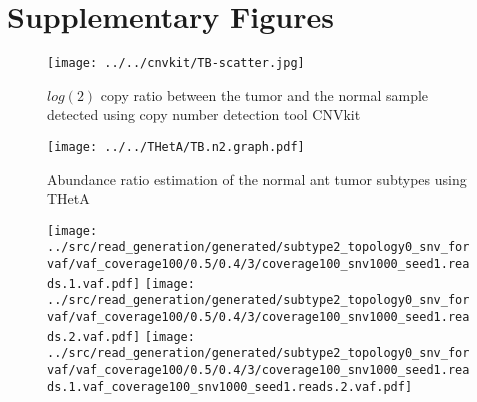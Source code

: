 \documentclass{article}
\begin{document}
\section*{Supplementary Figures}
\begin{figure}[H]
 \texttt{[image: ../../cnvkit/TB-scatter.jpg]}
 \caption{$log(2)$ copy ratio between the tumor and the normal sample detected using copy number detection tool CNVkit~\cite{talevich2016cnvkit}}
\end{figure}

\begin{figure}[H]
  \texttt{[image: ../../THetA/TB.n2.graph.pdf]}
 \caption{Abundance ratio estimation of the normal ant tumor subtypes using THetA}
\end{figure}

\begin{figure}[H]
\end{figure}

\begin{figure}[H]
\end{figure}

\begin{figure}[H]
 \texttt{[image: ../src/read\_generation/generated/subtype2\_topology0\_snv\_forvaf/vaf\_coverage100/0.5/0.4/3/coverage100\_snv1000\_seed1.reads.1.vaf.pdf]}
 \texttt{[image: ../src/read\_generation/generated/subtype2\_topology0\_snv\_forvaf/vaf\_coverage100/0.5/0.4/3/coverage100\_snv1000\_seed1.reads.2.vaf.pdf]}
 \texttt{[image: ../src/read\_generation/generated/subtype2\_topology0\_snv\_forvaf/vaf\_coverage100/0.5/0.4/3/coverage100\_snv1000\_seed1.reads.1.vaf\_coverage100\_snv1000\_seed1.reads.2.vaf.pdf]}
\end{figure}
\end{document}
